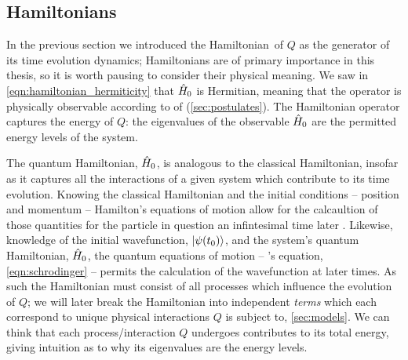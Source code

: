 \subsection{Hamiltonians}\label{sec:hamiltonians}
In the previous section we introduced the Hamiltonian\footnotemark \ of $Q$ as the generator of its 
    time evolution dynamics;
    Hamiltonians are of primary importance in this thesis, so it is worth pausing to consider their physical meaning. 
We saw in \cref{eqn:hamiltonian_hermiticity} that $\hat{H}_0$ is Hermitian, 
    meaning that the operator is physically observable 
    according to 
    of  (\cref{sec:postulates}). 
The Hamiltonian operator captures the energy of $Q$: 
    the eigenvalues of the observable $\hat{H}_0$ are the permitted energy levels of the system.
\par 

The quantum Hamiltonian, $\hat{H}_0$, is analogous to the classical Hamiltonian, 
    insofar as it captures all the interactions of a given system which contribute to its time evolution.
Knowing the classical Hamiltonian and the initial conditions -- position and momentum -- 
    Hamilton's equations of motion allow for the calcaultion of those quantities for the particle 
    in question an infintesimal time later \cite{susskind2014classical}.    
Likewise, knowledge of the initial wavefunction, $\ket{\psi(t_0)}$, and the system's quantum Hamiltonian, $\hat{H}_0$, 
    the quantum equations of motion -- \schrodinger's equation, \cref{eqn:schrodinger} -- 
    permits the calculation of the wavefunction at later times.
As such the Hamiltonian must consist of all processes which influence the evolution of $Q$;
    we will later break the Hamiltonian into independent \emph{terms} which each correspond to unique physical interactions
    $Q$ is subject to, \cref{sec:models}. 
We can think that each process/interaction $Q$ undergoes contributes to its total energy,
    giving intuition as to why its eigenvalues are the energy levels. 
\par 
{}

